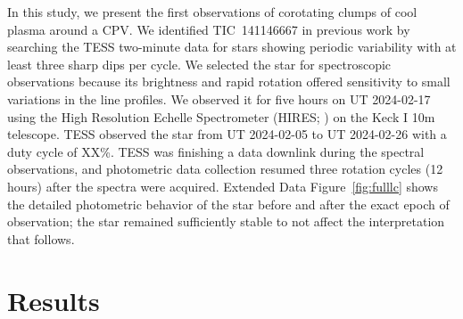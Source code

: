 \documentclass{nature3}
\begin{document}
In this study, we present the first observations of corotating clumps
of cool plasma around a CPV.  We identified TIC~141146667 in previous
work \cite{Bouma2024} by searching the TESS two-minute data for stars
showing periodic variability with at least three sharp dips per cycle.
We selected the star for spectroscopic observations because its
brightness and rapid rotation offered sensitivity to small variations
in the line profiles.  We observed it for five hours on UT 2024-02-17
using the High Resolution Echelle Spectrometer (HIRES;
\cite{vogt_hires_1994}) on the Keck I 10m telescope.  TESS observed
the star from UT 2024-02-05 to UT 2024-02-26 with a duty cycle of
XX\%.  TESS was finishing a data downlink during the spectral
observations, and photometric data collection resumed three rotation
cycles (12 hours) after the spectra were acquired.  Extended Data
Figure~\ref{fig:fulllc} shows the detailed photometric behavior of the
star before and after the exact epoch of observation; the star
remained sufficiently stable to not affect the interpretation that
follows.


\section{Results}
\end{document}
